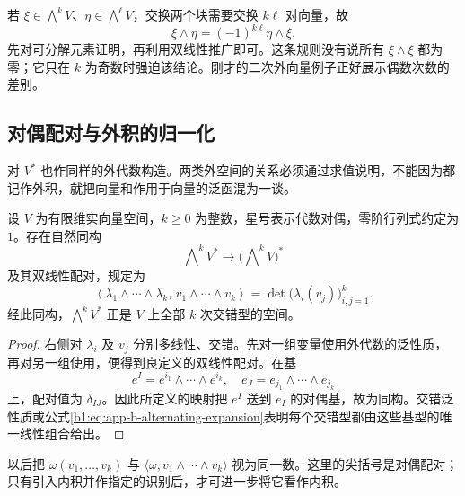 \ProseParagraphBreak

若 \(\xi\in\bigwedge^kV\)、\(\eta\in\bigwedge^\ell V\)，交换两个块需要交换 \(k\ell\) 对向量，故
\[
 \xi\wedge\eta=(-1)^{k\ell}\eta\wedge\xi.
\]
先对可分解元素证明，再利用双线性推广即可。这条规则没有说所有 \(\xi\wedge\xi\) 都为零；它只在 \(k\) 为奇数时强迫该结论。刚才的二次外向量例子正好展示偶数次数的差别。

\subsection{对偶配对与外积的归一化}
\label{b1:subsec:B10203}

对 \(V^*\) 也作同样的外代数构造。两类外空间的关系必须通过求值说明，不能因为都记作外积，就把向量和作用于向量的泛函混为一谈。

\begin{proposition}\label{b1:prop:app-b-form-pairing}
设 \(V\) 为有限维实向量空间，\(k\ge0\) 为整数，星号表示代数对偶，零阶行列式约定为 \(1\)。存在自然同构
\[
 \bigwedge\nolimits^kV^*
   \longrightarrow \bigl(\bigwedge\nolimits^kV\bigr)^*
\]
及其双线性配对，规定为
\[
 \left\langle
  \lambda_1\wedge\cdots\wedge\lambda_k,\,
  v_1\wedge\cdots\wedge v_k
 \right\rangle
 =\det\bigl(\lambda_i(v_j)\bigr)_{i,j=1}^k.
\]
经此同构，\(\bigwedge^kV^*\) 正是 \(V\) 上全部 \(k\) 次交错型的空间。
\end{proposition}
\begin{proof}
右侧对 \(\lambda_i\) 及 \(v_j\) 分别多线性、交错。先对一组变量使用外代数的泛性质，再对另一组使用，便得到良定义的双线性配对。在基
\[
 e^I=e^{i_1}\wedge\cdots\wedge e^{i_k},
 \quad e_J=e_{j_1}\wedge\cdots\wedge e_{j_k}
\]
上，配对值为 \(\delta_{IJ}\)。因此所定义的映射把 \(e^I\) 送到 \(e_I\) 的对偶基，故为同构。交错泛性质或公式\eqref{b1:eq:app-b-alternating-expansion}表明每个交错型都由这些基型的唯一线性组合给出。
\end{proof}

以后把 \(\omega(v_1,\ldots,v_k)\) 与
\(\langle\omega,v_1\wedge\cdots\wedge v_k\rangle\) 视为同一数。这里的尖括号是对偶配对；只有引入内积并作指定的识别后，才可进一步将它看作内积。

\ProseParagraphBreak

